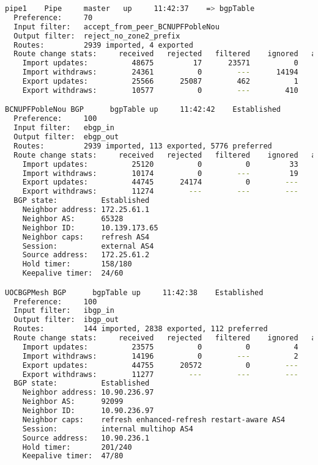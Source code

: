 \begin{lstlisting}[language=bash, caption={Birdc4 show protocols all}]
pipe1    Pipe     master   up     11:42:37    => bgpTable
  Preference:     70
  Input filter:   accept_from_peer_BCNUPFPobleNou
  Output filter:  reject_no_zone2_prefix
  Routes:         2939 imported, 4 exported
  Route change stats:     received   rejected   filtered    ignored   accepted
    Import updates:          48675         17      23571          0      25087
    Import withdraws:        24361          0        ---      14194      10155
    Export updates:          25566      25087        462          1         16
    Export withdraws:        10577          0        ---        410         12

BCNUPFPobleNou BGP      bgpTable up     11:42:42    Established
  Preference:     100
  Input filter:   ebgp_in
  Output filter:  ebgp_out
  Routes:         2939 imported, 113 exported, 5776 preferred
  Route change stats:     received   rejected   filtered    ignored   accepted
    Import updates:          25120          0          0         33      25087
    Import withdraws:        10174          0        ---         19      10155
    Export updates:          44745      24174          0        ---      20571
    Export withdraws:        11274        ---        ---        ---      15381
  BGP state:          Established
    Neighbor address: 172.25.61.1
    Neighbor AS:      65328
    Neighbor ID:      10.139.173.65
    Neighbor caps:    refresh AS4
    Session:          external AS4
    Source address:   172.25.61.2
    Hold timer:       158/180
    Keepalive timer:  24/60

UOCBGPMesh BGP      bgpTable up     11:42:38    Established
  Preference:     100
  Input filter:   ibgp_in
  Output filter:  ibgp_out
  Routes:         144 imported, 2838 exported, 112 preferred
  Route change stats:     received   rejected   filtered    ignored   accepted
    Import updates:          23575          0          0          4      23571
    Import withdraws:        14196          0        ---          2      14194
    Export updates:          44755      20572          0        ---      24183
    Export withdraws:        11277        ---        ---        ---      13433
  BGP state:          Established
    Neighbor address: 10.90.236.97
    Neighbor AS:      92099
    Neighbor ID:      10.90.236.97
    Neighbor caps:    refresh enhanced-refresh restart-aware AS4
    Session:          internal multihop AS4
    Source address:   10.90.236.1
    Hold timer:       201/240
    Keepalive timer:  47/80
\end{lstlisting}